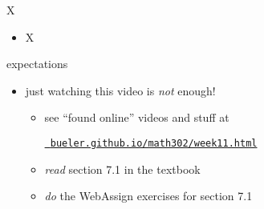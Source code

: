 \documentclass[urlcolor=blue,dvipsnames]{beamer}
\begin{document}
\begin{frame}{X}

\begin{itemize}
\item X
\end{itemize}
\end{frame}


\begin{frame}{expectations}

\begin{itemize}
\item just watching this video is \emph{not} enough!
     \begin{itemize}
     \item see ``found online'' videos and stuff at

     \centerline{\href{https://bueler.github.io/math302/week10.html}{\tt \color{cyan} bueler.github.io/math302/week11.html}}
     \item \emph{read} section 7.1 in the textbook
     \item \emph{do} the WebAssign exercises for section 7.1
     \end{itemize}
\end{itemize}
\end{frame}
\end{document}
